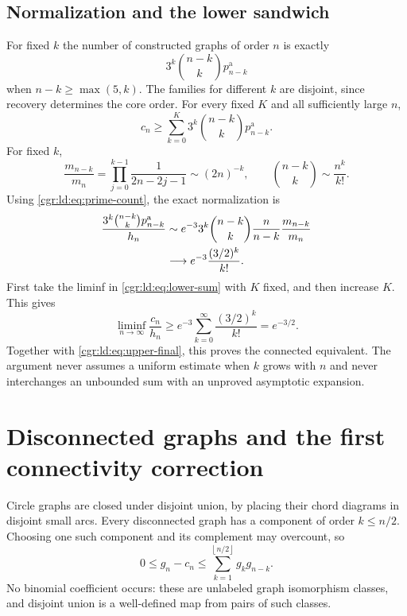 \documentclass[11pt,letterpaper]{article}
\numberwithin{equation}{section}
\theoremstyle{definition}\newtheorem{definition}[theorem]{Definition}
\theoremstyle{remark}\newtheorem{remark}[theorem]{Remark}
\newcommand{\floor}[1]{\left\lfloor #1\right\rfloor}
\begin{document}
\subsection{Normalization and the lower sandwich}
For fixed $k$ the number of constructed graphs of order $n$ is
exactly
\begin{equation}\label{cgr:ld:eq:decorate-count}
 3^k\binom{n-k}{k}p_{n-k}^{\mathrm a}
\end{equation}
when $n-k\ge\max(5,k)$. The families for different $k$ are
disjoint, since recovery determines the core order. For every
fixed $K$ and all sufficiently large $n$,
\begin{equation}\label{cgr:ld:eq:lower-sum}
 c_n\ge\sum_{k=0}^{K}3^k\binom{n-k}{k}p_{n-k}^{\mathrm a}.
\end{equation}
For fixed $k$,
\begin{equation}\label{cgr:ld:eq:ratio-m}
 \frac{m_{n-k}}{m_n}
 =\prod_{j=0}^{k-1}\frac1{2n-2j-1}
 \sim(2n)^{-k},\qquad
 \binom{n-k}{k}\sim\frac{n^k}{k!}.
\end{equation}
Using \eqref{cgr:ld:eq:prime-count}, the exact normalization is
\begin{align}
 \frac{3^k\binom{n-k}{k}p_{n-k}^{\mathrm a}}{h_n}
 &\sim e^{-3}3^k\binom{n-k}{k}
          \frac n{n-k}\frac{m_{n-k}}{m_n}\notag\\
 &\longrightarrow e^{-3}\frac{(3/2)^k}{k!}.\label{cgr:ld:eq:lower-term}
\end{align}
First take the liminf in \eqref{cgr:ld:eq:lower-sum} with $K$ fixed,
and then increase $K$. This gives
\begin{equation}\label{cgr:ld:eq:lower-final}
 \liminf_{n\to\infty}\frac{c_n}{h_n}
 \ge e^{-3}\sum_{k=0}^{\infty}\frac{(3/2)^k}{k!}
 =e^{-3/2}.
\end{equation}
Together with \eqref{cgr:ld:eq:upper-final}, this proves the connected
equivalent. The argument never assumes a uniform estimate when
$k$ grows with $n$ and never interchanges an unbounded sum with
an unproved asymptotic expansion.

\section{Disconnected graphs and the first connectivity correction}\label{cgr:ld:sec:disconnected}
Circle graphs are closed under disjoint union, by placing their
chord diagrams in disjoint small arcs. Every disconnected graph
has a component of order $k\le n/2$. Choosing one such component
and its complement may overcount, so
\begin{equation}\label{cgr:ld:eq:component-bound}
 0\le g_n-c_n\le
 \sum_{k=1}^{\floor{n/2}}g_kg_{n-k}.
\end{equation}
No binomial coefficient occurs: these are unlabeled graph
isomorphism classes, and disjoint union is a well-defined map
from pairs of such classes.
\end{document}
